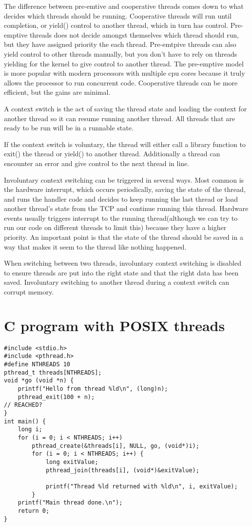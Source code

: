 \documentclass[a4paper]{article}
\begin{document}
The difference between pre-emtive and cooperative threads comes down to what decides which threads should be running. Cooperative threads will run until completion, or yield() control to another thread, which in turn has control. Pre-emptive threads does not decide amongst themselves which thread should run, but they have assigned priority the each thread. Pre-emtpive threads can also yield control to other threads manually, but you don't have to rely on threads yielding for the kernel to give control to another thread. The pre-emptive model is more popular with modern processors with multiple cpu cores because it truly allows the processor to run concurrent code. Cooperative threads can be more efficient, but the gains are minimal.

A context switch is the act of saving the thread state and loading the context for another thread so it can resume running another thread. All threads that are ready to be run will be in a runnable state.

If the context switch is voluntary, the thread will either call a library function to exit() the thread or yield() to another thread. Additionally a thread can encounter an error and give control to the next thread in line. 

Involuntary context switching can be triggered in several ways. Most common is the hardware interrupt, which occurs periodically, saving the state of the thread, and runs the handler code and decides to keep running the last thread or load another thread's state from the TCP and continue running this thread. Hardware events usually triggers interrupt to the running thread(although we can try to run our code on different threads to limit this) because they have a higher priority. An important point is that the state of the thread should be saved in a way that makes it seem to the thread like nothing happened.

When switching between two threads, involuntary context switching is disabled to ensure threads are put into the right state and that the right data has been saved. Involuntary switching to another thread during a context switch can corrupt memory.



\section{C program with POSIX threads}

\begin{lstlisting}[style=CStyle]
#include <stdio.h>
#include <pthread.h>
#define NTHREADS 10
pthread_t threads[NTHREADS];
void *go (void *n) {
    printf("Hello from thread %ld\n", (long)n);
    pthread_exit(100 + n);
// REACHED?
}
int main() {
    long i;
    for (i = 0; i < NTHREADS; i++) 
        pthread_create(&threads[i], NULL, go, (void*)i);
        for (i = 0; i < NTHREADS; i++) {
            long exitValue;
            pthread_join(threads[i], (void*)&exitValue);

            printf("Thread %ld returned with %ld\n", i, exitValue);
        }       
    printf("Main thread done.\n");
    return 0;
}
\end{lstlisting}
\end{document}
